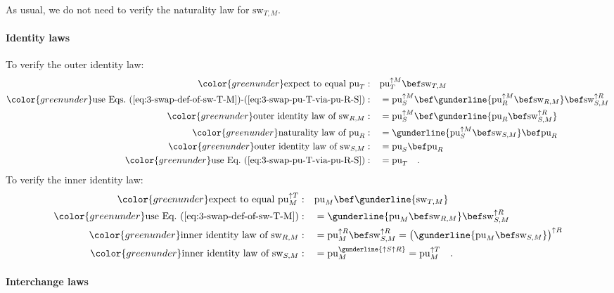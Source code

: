 As usual, we do not need to verify the naturality law for $\text{sw}_{T,M}$.

\paragraph{Identity laws}

To verify the outer identity law:
\begin{align*}
{\color{greenunder}\text{expect to equal }\text{pu}_{T}:}\quad & \text{pu}_{T}^{\uparrow M}\bef\text{sw}_{T,M}\\
{\color{greenunder}\text{use Eqs.~(\ref{eq:3-swap-def-of-sw-T-M})-(\ref{eq:3-swap-pu-T-via-pu-R-S})}:}\quad & =\text{pu}_{S}^{\uparrow M}\bef\gunderline{\text{pu}_{R}^{\uparrow M}\bef\text{sw}_{R,M}}\bef\text{sw}_{S,M}^{\uparrow R}\\
{\color{greenunder}\text{outer identity law of }\text{sw}_{R,M}:}\quad & =\text{pu}_{S}^{\uparrow M}\bef\gunderline{\text{pu}_{R}\bef\text{sw}_{S,M}^{\uparrow R}}\\
{\color{greenunder}\text{naturality law of }\text{pu}_{R}:}\quad & =\gunderline{\text{pu}_{S}^{\uparrow M}\bef\text{sw}_{S,M}}\bef\text{pu}_{R}\\
{\color{greenunder}\text{outer identity law of }\text{sw}_{S,M}:}\quad & =\text{pu}_{S}\bef\text{pu}_{R}\\
{\color{greenunder}\text{use Eq.~(\ref{eq:3-swap-pu-T-via-pu-R-S})}:}\quad & =\text{pu}_{T}\quad.
\end{align*}
To verify the inner identity law:
\begin{align*}
{\color{greenunder}\text{expect to equal }\text{pu}_{M}^{\uparrow T}:}\quad & \text{pu}_{M}\bef\gunderline{\text{sw}_{T,M}}\\
{\color{greenunder}\text{use Eq.~(\ref{eq:3-swap-def-of-sw-T-M})}:}\quad & =\gunderline{\text{pu}_{M}\bef\text{sw}_{R,M}}\bef\text{sw}_{S,M}^{\uparrow R}\\
{\color{greenunder}\text{inner identity law of }\text{sw}_{R,M}:}\quad & =\text{pu}_{M}^{\uparrow R}\bef\text{sw}_{S,M}^{\uparrow R}=\big(\gunderline{\text{pu}_{M}\bef\text{sw}_{S,M}}\big)^{\uparrow R}\\
{\color{greenunder}\text{inner identity law of }\text{sw}_{S,M}:}\quad & =\text{pu}_{M}^{\gunderline{\uparrow S\uparrow R}}=\text{pu}_{M}^{\uparrow T}\quad.
\end{align*}


\paragraph{Interchange laws}

